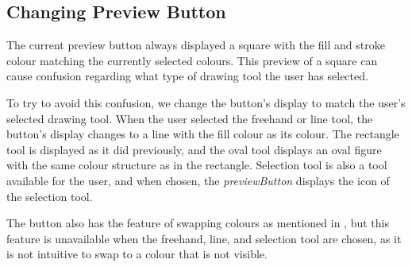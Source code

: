 \subsection{Changing Preview Button}
The current preview button always displayed a square with the fill and stroke colour matching the currently selected colours.
This preview of a square can cause confusion regarding what type of drawing tool the user has selected.

To try to avoid this confusion, we change the button's display to match the user's selected drawing tool.
When the user selected the freehand or line tool, the button's display changes to a line with the fill colour as its colour.
The rectangle tool is displayed as it did previously, and the oval tool displays an oval figure with the same colour structure as in the rectangle.
Selection tool is also a tool available for the user, and when chosen, the \textit{previewButton} displays the icon of the selection tool.

The button also has the feature of swapping colours as mentioned in , but this feature is unavailable when the freehand, line, and selection tool are chosen, as it is not intuitive to swap to a colour that is not visible. 